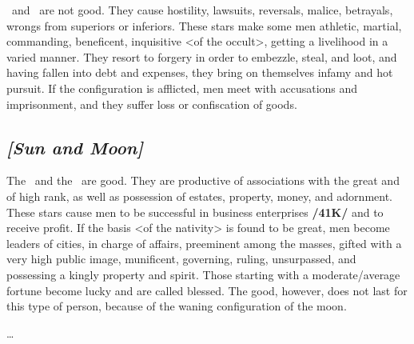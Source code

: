 \Mercury\, and \Mars\, are not good. They cause hostility, lawsuits, reversals, malice, betrayals, wrongs
from superiors or inferiors. These stars make some men athletic, martial, commanding, beneficent, inquisitive <of the occult>, getting a livelihood in a varied manner. They resort to forgery in order to embezzle, steal, and loot, and having fallen into debt and expenses, they bring on themselves infamy and hot pursuit. If the configuration is afflicted, men meet with accusations and imprisonment, and they suffer
loss or confiscation of goods.

\secbr
{}
\subsection{\textit{[Sun and Moon]}}
The \Sun\, and the \Moon\, are good. They are productive of associations with the great and of high rank,
as well as possession of estates, property, money, and adornment. These stars cause men to be successful in business enterprises \textbf{/41K/} and to receive profit. If the basis <of the nativity> is found to be great, men become leaders of cities, in charge of affairs, preeminent among the masses, gifted with a very high public image, munificent, governing, ruling, unsurpassed, and possessing a kingly property and spirit. Those starting with a moderate/average fortune become lucky and are called blessed. The good, however, does not last for this type of person, because of the waning configuration of the moon. 

\ldots


\newpage